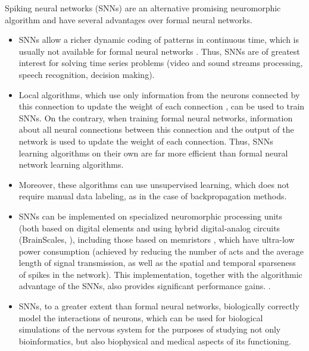 \documentclass[a4paper,10pt]{article}
\begin{document}
Spiking neural networks (SNNs) are an alternative promising neuromorphic algorithm and have several advantages over formal neural networks.

\begin{itemize}
\item SNNs allow a richer dynamic coding of patterns in continuous time, which is usually not available for formal neural networks \cite{Ismail_Fawaz_2019}. Thus, SNNs are of greatest interest for solving time series problems (video and sound streams processing, speech recognition, decision making).

\item Local algorithms, which use only information from the neurons connected by this connection to update the weight of each connection \cite{STDP, pehlevan2019spiking, Baldi_2016}, can be used to train SNNs. On the contrary, when training formal neural networks, information about all neural connections between this connection and the output of the network is used to update the weight of each connection. Thus, SNNs learning algorithms on their own are far more efficient than formal neural network learning algorithms.

\item Moreover, these algorithms can use unsupervised learning, which does not require manual data labeling, as in the case of backpropagation methods.

\item SNNs can be implemented on specialized neuromorphic processing units (both based on digital elements \cite{TrueNorth, Loihi, Akida} and using hybrid digital-analog circuits (BrainScales, \cite{SpiNNaker}), including those based on memristors \cite{WANG2020101809}, which have ultra-low power consumption (achieved by reducing the number of acts and the average length of signal transmission, as well as the spatial and temporal sparseness of spikes in the network). This implementation, together with the algorithmic advantage of the SNNs, also provides significant performance gains. \cite{hardware1, hardware2}.

\item SNNs, to a greater extent than formal neural networks, biologically correctly model the interactions of neurons, which can be used for biological simulations of the nervous system for the purposes of studying not only bioinformatics, but also biophysical and medical aspects of its functioning.
\end{itemize}
\end{document}
